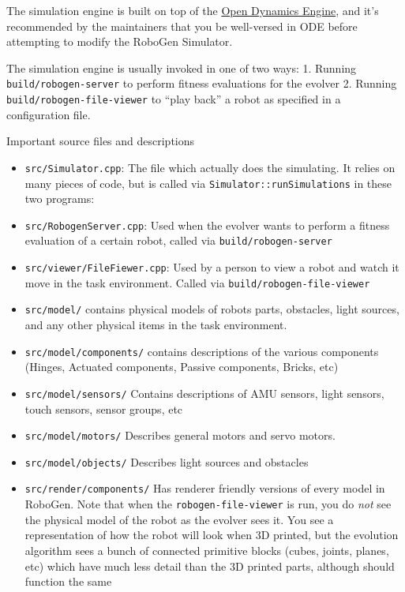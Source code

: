The simulation engine is built on top of the
\href{http://www.ode.org/}{Open Dynamics Engine}, and it's recommended
by the maintainers that you be well-versed in ODE before attempting to
modify the RoboGen Simulator.

The simulation engine is usually invoked in one of two ways: 1. Running
\texttt{build/robogen-server} to perform fitness evaluations for the
evolver 2. Running \texttt{build/robogen-file-viewer} to ``play back'' a
robot as specified in a configuration file.

Important source files and descriptions 
\begin{itemize}
    \item \texttt{src/Simulator.cpp}: The file which actually does the
        simulating. It relies on many pieces of code, but is called via
        \texttt{Simulator::runSimulations} in these two programs: 
    \item \texttt{src/RobogenServer.cpp}: Used when the evolver wants
        to perform a fitness evaluation of a certain robot, called via
        \texttt{build/robogen-server} 
    \item \texttt{src/viewer/FileFiewer.cpp}: Used by a person to view a robot
        and watch it move in the task environment.  Called via
        \texttt{build/robogen-file-viewer} 
    \item \texttt{src/model/} contains physical models of robots parts,
        obstacles, light sources, and any other physical items in the task
        environment. 
    \item \texttt{src/model/components/} contains descriptions of the various
        components (Hinges, Actuated components, Passive components, Bricks,
        etc) 
    \item \texttt{src/model/sensors/} Contains descriptions of AMU sensors,
        light sensors, touch sensors, sensor groups, etc 
    \item  \texttt{src/model/motors/} Describes general motors and servo motors. 
    \item  \texttt{src/model/objects/} Describes light sources and obstacles 
    \item  \texttt{src/render/components/} Has renderer friendly versions of
        every model in RoboGen. Note that when the \texttt{robogen-file-viewer}
        is run, you do \emph{not} see the physical model of the robot as the
        evolver sees it. You see a representation of how the robot will look
        when 3D printed, but the evolution algorithm sees a bunch of connected
        primitive blocks (cubes, joints, planes, etc) which have much less
        detail than the 3D printed parts, although should function the same
\end{itemize}

